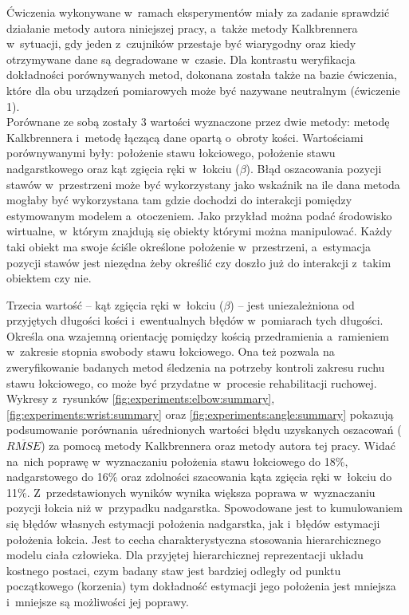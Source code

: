Ćwiczenia wykonywane w~ramach eksperymentów miały za zadanie sprawdzić działanie metody autora niniejszej pracy, a~także metody Kalkbrennera w~sytuacji, gdy jeden z~czujników przestaje być wiarygodny oraz kiedy otrzymywane dane są degradowane w~czasie. Dla kontrastu weryfikacja dokładności porównywanych metod, dokonana została także na bazie ćwiczenia, które dla obu urządzeń pomiarowych może być nazywane neutralnym (ćwiczenie 1).\\

Porównane ze sobą zostały 3 wartości wyznaczone przez dwie metody: metodę Kalkbrennera i~metodę łączącą dane opartą o~obroty kości. Wartościami porównywanymi były: położenie stawu łokciowego, położenie stawu nadgarstkowego oraz kąt zgięcia ręki w~łokciu ($\beta$). Błąd oszacowania pozycji stawów w~przestrzeni może być wykorzystany jako wskaźnik na ile dana metoda mogłaby być wykorzystana tam gdzie dochodzi do interakcji pomiędzy estymowanym modelem a~otoczeniem. Jako przykład można podać środowisko wirtualne, w~którym znajdują się obiekty którymi można manipulować. Każdy taki obiekt ma swoje ściśle określone położenie w~przestrzeni, a~estymacja pozycji stawów jest niezędna żeby określić czy doszło już do interakcji z~takim obiektem czy nie.
 
Trzecia wartość -- kąt zgięcia ręki w~łokciu ($\beta$) -- jest uniezależniona od przyjętych długości kości i~ewentualnych błędów w~pomiarach tych długości. Określa ona wzajemną orientację pomiędzy kością przedramienia a~ramieniem w~zakresie stopnia swobody stawu łokciowego. Ona też pozwala na zweryfikowanie badanych metod śledzenia na potrzeby kontroli zakresu ruchu stawu łokciowego, co może być przydatne w~procesie rehabilitacji ruchowej. \\ 

Wykresy z~rysunków \ref{fig:experiments:elbow:summary}, \ref{fig:experiments:wrist:summary} oraz \ref{fig:experiments:angle:summary} pokazują podsumowanie porównania uśrednionych wartości błędu uzyskanych oszacowań ($\overline{RMSE}$) za pomocą metody Kalkbrennera oraz metody autora tej pracy.
Widać na~nich poprawę w~wyznaczaniu położenia stawu łokciowego do 18\%, nadgarstowego do 16\% oraz zdolności szacowania kąta zgięcia ręki w~łokciu do 11\%. Z~przedstawionych wyników wynika większa poprawa w~wyznaczaniu pozycji łokcia niż w~przypadku nadgarstka. Spowodowane jest to kumulowaniem się błędów własnych estymacji położenia nadgarstka, jak i~błędów estymacji położenia łokcia. Jest to cecha charakterystyczna stosowania hierarchicznego modelu ciała człowieka. Dla przyjętej hierarchicznej reprezentacji układu kostnego postaci, czym badany staw jest bardziej odległy od punktu początkowego (korzenia) tym dokładność estymacji jego położenia jest mniejsza i~mniejsze są możliwości jej poprawy.\\

